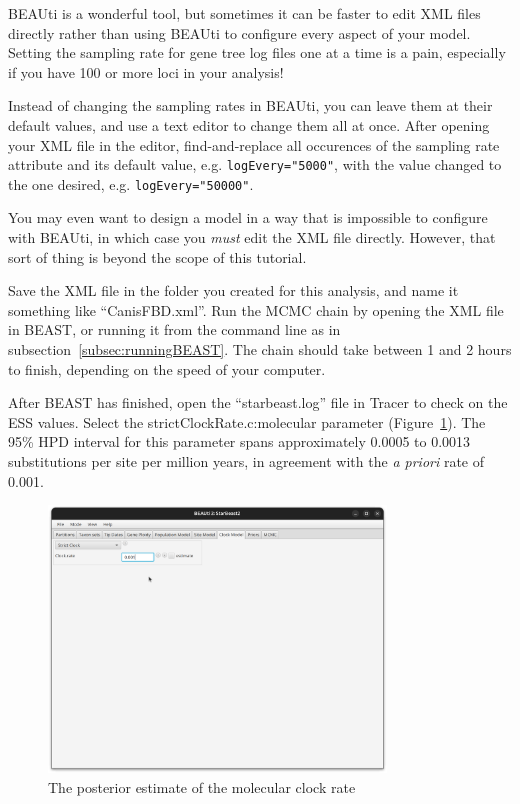 \documentclass[12pt]{article}
\begin{document}
\begin{tcolorbox}[colback=orange!5,colframe=orange!40!black,title=Editing BEAST XML files]
BEAUti is a wonderful tool, but sometimes it can be faster to edit XML files directly rather than using BEAUti to configure every aspect of your model. Setting the sampling rate for gene tree log files one at a time is a pain, especially if you have 100 or more loci in your analysis!

Instead of changing the sampling rates in BEAUti, you can leave them at their default values, and use a text editor to change them all at once. After opening your XML file in the editor, find-and-replace all occurences of the sampling rate attribute and its default value, e.g. \texttt{logEvery="5000"}, with the value changed to the one desired, e.g. \texttt{logEvery="50000"}.

You may even want to design a model in a way that is impossible to configure with BEAUti, in which case you \textit{must} edit the XML file directly. However, that sort of thing is beyond the scope of this tutorial.
\end{tcolorbox}

Save the XML file in the folder you created for this analysis, and name it
something like ``CanisFBD.xml''. Run the MCMC chain by opening the XML file in
BEAST, or running it from the command line as in
subsection~\ref{subsec:runningBEAST}. The chain should take between 1 and 2 hours to
finish, depending on the speed of your computer.

After BEAST has finished, open the ``starbeast.log'' file in Tracer to check
on the ESS values. Select the strictClockRate.c:molecular parameter
(Figure~\ref{fig:strictClockRate}). The 95\% HPD interval for this parameter
spans approximately 0.0005 to 0.0013 substitutions per site per million years,
in agreement with the \textit{a priori} rate of 0.001.

\begin{figure}[htb!]
\centering
\includegraphics[width=0.8\textwidth]{figures/strictClockRate.png}
\caption
{The posterior estimate of the molecular clock rate}
\label{fig:strictClockRate}
\end{figure}
\end{document}
